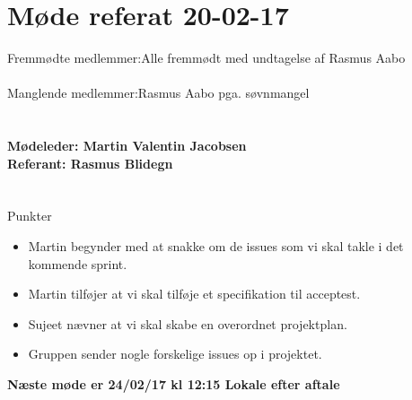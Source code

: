 \documentclass[12pt]{article}
\begin{document}
\section*{Møde referat 20-02-17}

Fremmødte medlemmer:Alle fremmødt med undtagelse af Rasmus Aabo\\\\
Manglende medlemmer:Rasmus Aabo pga. søvnmangel\\\\ 
\\\textbf{Mødeleder: Martin Valentin Jacobsen}
\\\textbf{Referant: Rasmus Blidegn}
\\\\\\
Punkter
\begin{itemize}
\item Martin begynder med at snakke om de issues som vi skal takle i det kommende sprint. 
\item Martin tilføjer at vi skal tilføje et specifikation til acceptest.
\item Sujeet nævner at vi skal skabe en overordnet projektplan.
\item Gruppen sender nogle forskelige issues op i projektet. 
\end{itemize}

\large{\textbf{Næste møde er 24/02/17 kl 12:15 Lokale efter aftale }}
\end{document}

